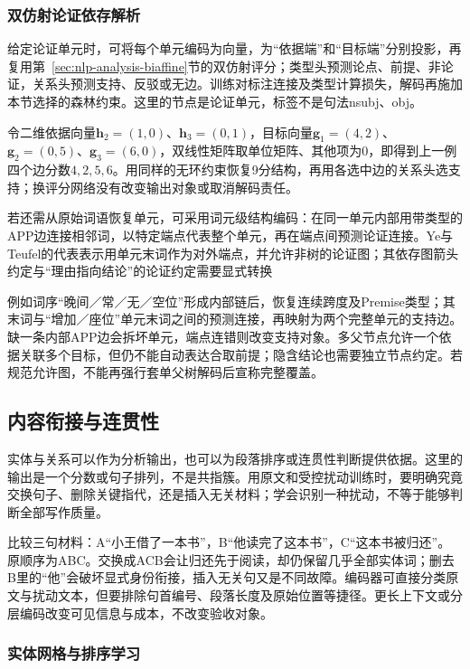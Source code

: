 \subsubsection{双仿射论证依存解析}
\label{sec:nlp-analysis-argument-biaffine}

给定论证单元时，可将每个单元编码为向量，为“依据端”和“目标端”分别投影，再复用第~\ref{sec:nlp-analysis-biaffine}节的双仿射评分；类型头预测论点、前提、非论证，关系头预测支持、反驳或无边。训练对标注连接及类型计算损失，解码再施加本节选择的森林约束。这里的节点是论证单元，标签不是句法nsubj、obj。

令二维依据向量$\bm h_2=(1,0)$、$\bm h_3=(0,1)$，目标向量$\bm g_1=(4,2)$、$\bm g_2=(0,5)$、$\bm g_3=(6,0)$，双线性矩阵取单位矩阵、其他项为0，即得到上一例四个边分数$4,2,5,6$。用同样的无环约束恢复9分结构，再用各选中边的关系头选支持；换评分网络没有改变输出对象或取消解码责任。

若还需从原始词语恢复单元，可采用词元级结构编码：在同一单元内部用带类型的APP边连接相邻词，以特定端点代表整个单元，再在端点间预测论证连接。Ye与Teufel的代表表示用单元末词作为对外端点，并允许非树的论证图；其依存图箭头约定与“理由指向结论”的论证约定需要显式转换

例如词序“晚间／常／无／空位”形成内部链后，恢复连续跨度及Premise类型；其末词与“增加／座位”单元末词之间的预测连接，再映射为两个完整单元的支持边。缺一条内部APP边会拆坏单元，端点连错则改变支持对象。多父节点允许一个依据关联多个目标，但仍不能自动表达合取前提；隐含结论也需要独立节点约定。若规范允许图，不能再强行套单父树解码后宣称完整覆盖。

\subsection{内容衔接与连贯性}
\label{sec:nlp-analysis-coherence}

实体与关系可以作为分析输出，也可以为段落排序或连贯性判断提供依据。这里的输出是一个分数或句子排列，不是共指簇。用原文和受控扰动训练时，要明确究竟交换句子、删除关键指代，还是插入无关材料；学会识别一种扰动，不等于能够判断全部写作质量。

比较三句材料：A“小王借了一本书”，B“他读完了这本书”，C“这本书被归还”。原顺序为ABC。交换成ACB会让归还先于阅读，却仍保留几乎全部实体词；删去B里的“他”会破坏显式身份衔接，插入无关句又是不同故障。编码器可直接分类原文与扰动文本，但要排除句首编号、段落长度及原始位置等捷径。更长上下文或分层编码改变可见信息与成本，不改变验收对象。

\subsubsection{实体网格与排序学习}
\label{sec:nlp-analysis-entity-grid}

